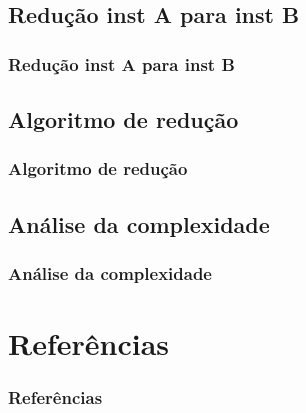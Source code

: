 \documentclass{beamer}
\begin{document}
\subsection{Redução inst A para inst B}
\begin{frame}
\frametitle{Redução inst A para inst B}
\end{frame}

\subsection{Algoritmo de redução}
\begin{frame}
\frametitle{Algoritmo de redução}
\end{frame}

\subsection{Análise da complexidade}
\begin{frame}
\frametitle{Análise da complexidade}
\end{frame}

\section{Referências}
\begin{frame}
\frametitle{Referências}
\end{frame}
\end{document}
